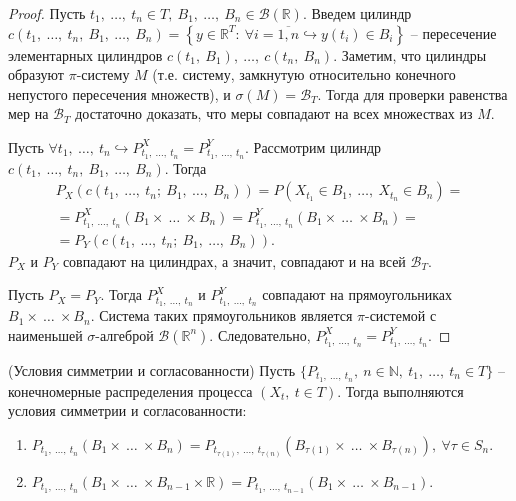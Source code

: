 \begin{proof}
Пусть $\displaystyle t_{1} ,\ \dotsc ,\ t_{n} \in T,\ B_{1} ,\ \dotsc ,\ B_{n} \in \mathcal{B}(\mathbb{R})$. Введем цилиндр $\displaystyle c( t_{1} ,\ \dotsc ,\ t_{n} ,\ B_{1} ,\ \dotsc ,\ B_{n}) =\left\{y\in \mathbb{R}^{T} :\ \forall i=\overline{1,n} \hookrightarrow y( t_{i}) \in B_{i}\right\}$ -- пересечение элементарных цилиндров $\displaystyle c( t_{1} ,\ B_{1}) ,\ \dotsc ,\ c( t_{n} ,\ B_{n})$. Заметим, что цилиндры образуют $\displaystyle \pi $-систему $\displaystyle M$ (т.е. систему, замкнутую относительно конечного непустого пересечения множеств), и $\displaystyle \sigma ( M) =\mathcal{B}_{T}$. Тогда для проверки равенства мер на $\displaystyle \mathcal{B}_{T}$ достаточно доказать, что меры совпадают на всех множествах из $\displaystyle M$.

Пусть $\displaystyle \forall t_{1} ,\ \dotsc ,\ t_{n} \hookrightarrow P_{t_{1} ,\ \dotsc ,\ t_{n}}^{X} =P_{t_{1} ,\ \dotsc ,\ t_{n}}^{Y}$. Рассмотрим цилиндр $\displaystyle c( t_{1} ,\ \dotsc ,\ t_{n} ,\ B_{1} ,\ \dotsc ,\ B_{n})$. Тогда
\begin{gather*}
P_{X}( c( t_{1} ,\ \dotsc ,\ t_{n} ;\ B_{1} ,\ \dotsc ,\ B_{n})) =P( X_{t_{1}} \in B_{1} ,\ \dotsc ,\ X_{t_{n}} \in B_{n}) =\\
=P_{t_{1} ,\ \dotsc ,\ t_{n}}^{X}( B_{1} \times \ \dotsc \ \times B_{n}) =P_{t_{1} ,\ \dotsc ,\ t_{n}}^{Y}( B_{1} \times \ \dotsc \ \times B_{n}) =\\
=P_{Y}( c( t_{1} ,\ \dotsc ,\ t_{n} ;\ B_{1} ,\ \dotsc ,\ B_{n})) .
\end{gather*}
$\displaystyle P_{X}$ и $\displaystyle P_{Y}$ совпадают на цилиндрах, а значит, совпадают и на всей $\displaystyle \mathcal{B}_{T}$.

Пусть $\displaystyle P_{X} =P_{Y}$. Тогда $\displaystyle P_{t_{1} ,\ \dotsc ,\ t_{n}}^{X}$ и $\displaystyle P_{t_{1} ,\ \dotsc ,\ t_{n}}^{Y}$ совпадают на прямоугольниках $\displaystyle B_{1} \times \ \dotsc \ \times B_{n}$. Система таких прямоугольников является $\displaystyle \pi $-системой с наименьшей $\displaystyle \sigma $-алгеброй $\displaystyle \mathcal{B}\left(\mathbb{R}^{n}\right)$. Следовательно, $\displaystyle P_{t_{1} ,\ \dotsc ,\ t_{n}}^{X} =P_{t_{1} ,\ \dotsc ,\ t_{n}}^{Y}$.
\end{proof}
\begin{lemma}
(Условия симметрии и согласованности) Пусть $\displaystyle \{P_{t_{1} ,\ \dotsc ,\ t_{n}} ,\ n\in \mathbb{N} ,\ t_{1} ,\ \dotsc ,\ t_{n} \in T\}$ -- конечномерные распределения процесса $\displaystyle ( X_{t} ,\ t\in T)$. Тогда выполняются условия симметрии и согласованности:

\begin{enumerate}
    \item $\displaystyle P_{t_{1} ,\ \dotsc ,\ t_{n}}( B_{1} \times \ \dotsc \ \times B_{n}) =P_{t_{\tau ( 1)} ,\ \dotsc ,\ t_{\tau ( n)}}( B_{\tau ( 1)} \times \ \dotsc \ \times B_{\tau ( n)}) ,\ \forall \tau \in S_{n}$.
    \item $\displaystyle P_{t_{1} ,\ \dotsc ,\ t_{n}}( B_{1} \times \ \dotsc \ \times B_{n-1} \times \mathbb{R}) =P_{t_{1} ,\ \dotsc ,\ t_{n-1}}( B_{1} \times \ \dotsc \ \times B_{n-1})$.
\end{enumerate}
\end{lemma}
